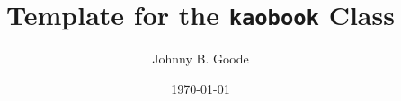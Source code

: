 \documentclass[
	fontsize=10pt, %
	twoside=true, %
]{kaobook}
\begin{document}

\titlehead{Document Template}
\title[Template for the {\normalfont\texttt{kaobook}} Class]{Template for the {\normalfont\texttt{kaobook}} Class}
\author[JBG]{Johnny B. Goode}
\date{\today}
\publishers{An Awesome Publisher}

%
\frontmatter %
%
%
%
%	
%	
%	
%	
%	
%	
%	
%
%
\end{document}
